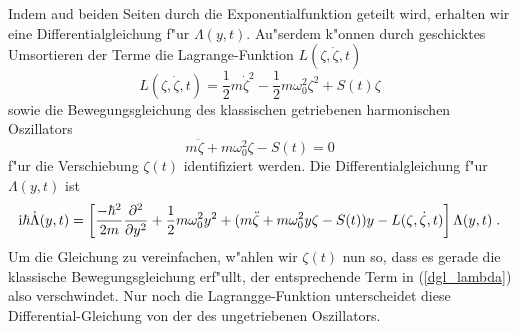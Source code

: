     \newpage

    Indem aud beiden Seiten durch die Exponentialfunktion geteilt wird, erhalten wir eine Differentialgleichung f"ur $\Lambda(y,t)$.
    Au"serdem k"onnen durch geschicktes Umsortieren der Terme die Lagrange-Funktion $L(\zeta,\dot \zeta, t)$
    \begin{equation}
      L(\zeta,\dot \zeta, t) = \frac{1}{2}m\dot \zeta^2 - \frac{1}{2}m\omega_0^2\zeta^2 + S(t)\zeta
    \end{equation}
      sowie die Bewegungsgleichung des klassischen getriebenen harmonischen  Oszillators \cite{husimi}
      \begin{equation}
        m\ddot \zeta + m\omega_0^2\zeta - S(t) = 0
      \end{equation}
    f"ur die Verschiebung $\zeta(t)$ identifiziert werden.
    Die Differentialgleichung f"ur $\Lambda(y,t)$ ist
    \begin{equation}
      \text i \hbar \dot \Lambda(y,t) = \left[ \frac{-\hbar^2}{2m}\frac{\partial^2}{\partial y^2} + \frac{1}{2}m\omega_0^2y^2 + (m\ddot \zeta + m\omega_0^2y\zeta - S(t))y - L(\zeta,\dot \zeta, t) \right]\Lambda(y,t) \; .
      \label{dgl_lambda}
    \end{equation}
    Um die Gleichung zu vereinfachen, w"ahlen wir $\zeta(t)$ nun so, dass es gerade die klassische Bewegungsgleichung erf"ullt, der entsprechende Term in (\ref{dgl_lambda}) also verschwindet.
    Nur noch die Lagrangge-Funktion unterscheidet diese Differential-Gleichung von der des ungetriebenen Oszillators.

